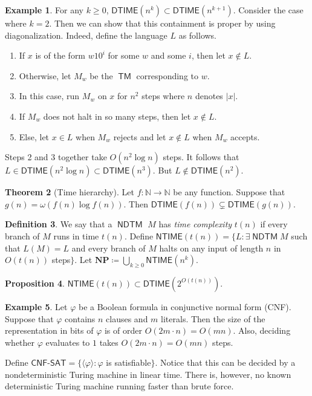 \documentclass[10pt,letterpaper,cm]{nupset}
\theoremstyle{definition}
\newtheorem{definition}{Definition}[subsection]
\newtheorem{exmp}[definition]{Example}
\theoremstyle{theorem}
\newtheorem{theorem}[definition]{Theorem}
\newtheorem{prop}[definition]{Proposition}
\theoremstyle{remark}
\newcommand{\N}{\mathbb N}
\newcommand{\1}{\mathbf{1}}
\newcommand{\0}{\vec 0}
\DeclareMathOperator{\TM}{\mathsf{TM}}
\DeclareMathOperator{\NDTM}{\mathsf{NDTM}}
\begin{document}
\begin{exmp}
For any $k\geq 0$, $\mathsf{DTIME}(n^k) \subset \mathsf{DTIME}(n^{k+1})$. Consider the case where $k=2$. Then we can show that this containment  is proper by using diagonalization. Indeed, define the language $L$ as follows. 
\begin{enumerate}
\item If $x$ is of the form $w10^i$ for some $w$ and some $i$, then let $x\notin L$.
\item Otherwise, let $M_w$ be the $\TM$ corresponding to $w$. 
\item In this case, run $M_w$ on $x$ for $n^2$ steps where $n$ denotes $\lvert{x}\rvert$. 
\item  If $M_w$ does not halt in so many steps, then let $x\notin L$. 
\item Else, let $x\in L$ when $M_w$ rejects and let $x\notin L$ when $M_w$ accepts. 
\end{enumerate}
Steps 2 and 3 together take $O(n^2 \log{n})$ steps. It follows that $L \in \mathsf{DTIME}(n^2\log{n})\subset \mathsf{DTIME}(n^3)$. But $L \notin \mathsf{DTIME}(n^2)$.
\end{exmp}

\begin{theorem}[Time hierarchy]
Let $f: \N \to \N$ be any function. Suppose that $g(n) = \omega(f(n) \log{f(n)})$. Then $\mathsf{DTIME}(f(n)) \subsetneq \mathsf{DTIME}(g(n))$.
\end{theorem}

\begin{definition}
We say that a $\NDTM$ $M$ has \textit{time complexity} $t(n)$ if every branch of $M$ runs in time $t(n)$. Define  $\mathsf{NTIME}(t(n)) = \{ L : \exists \NDTM M$ such that $L(M) = L$ and every branch of $M$ halts on any input of length $n$ in $O(t(n))$ steps$\}$. Let $\mathbf{NP} \coloneqq \bigcup_{k \geq 0} \mathsf{NTIME}(n^k)$.
\end{definition}

\begin{prop}
$\mathsf{NTIME}(t(n)) \subset \mathsf{DTIME}(2^{O(t(n))})$.
\end{prop}

\begin{exmp}
Let $\varphi$ be a Boolean formula in conjunctive normal form (CNF). Suppose that $\varphi$ contains $n$ clauses and $m$ literals. Then the size of the representation in bits of $\varphi$ is of order $O(2 m \cdot n) = O(mn)$. Also, deciding whether $\varphi$ evaluates to $1$ takes  $O(2 m \cdot n) = O(mn)$ steps. 

Define $\mathsf{CNF\text{-}SAT} = \{\langle \varphi \rangle : \varphi$ is satisfiable$\}$. Notice that this can be decided by a nondeterministic Turing machine in linear time.  There is, however, no known deterministic Turing machine running faster than brute force. 
\end{exmp}
\end{document}
